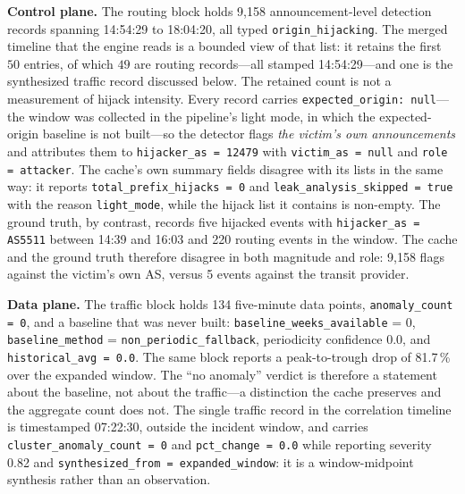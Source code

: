\textbf{Control plane.} The routing block holds 9{,}158
announcement-level detection records spanning 14:54:29 to 18:04:20, all
typed \texttt{origin\_hijacking}. The merged timeline that the engine
reads is a bounded view of that list: it retains the first $50$ entries,
of which $49$ are routing records---all stamped 14:54:29---and one is
the synthesized traffic record discussed below. The retained count is not
a measurement of hijack intensity. Every record carries
\texttt{expected\_origin: null}---the window was collected in the
pipeline's light mode, in which the expected-origin baseline is not
built---so the detector flags \emph{the victim's own announcements} and
attributes them to \texttt{hijacker\_as = 12479} with
\texttt{victim\_as = null} and \texttt{role = attacker}. The cache's own
summary fields disagree with its lists in the same way: it reports
\texttt{total\_prefix\_hijacks = 0} and
\texttt{leak\_analysis\_skipped = true} with the reason
\texttt{light\_mode}, while the hijack list it contains is non-empty. The
ground truth, by contrast, records five hijacked events with
\texttt{hijacker\_as = AS5511} between 14:39 and 16:03 and 220 routing
events in the window. The cache and the ground truth therefore disagree
in both magnitude and role: 9{,}158 flags against the victim's own AS,
versus 5 events against the transit provider.

\textbf{Data plane.} The traffic block holds 134 five-minute data
points, \texttt{anomaly\_count = 0}, and a baseline that was never
built: \texttt{baseline\_weeks\_available} = 0,
\texttt{baseline\_method} = \texttt{non\_periodic\_fallback}, periodicity
confidence 0.0, and \texttt{historical\_avg = 0.0}. The same block
reports a peak-to-trough drop of 81.7\,\% over the expanded window. The
``no anomaly'' verdict is therefore a statement about the baseline, not
about the traffic---a distinction the cache preserves and the aggregate
count does not. The single traffic record in the correlation timeline is
timestamped 07:22:30, outside the incident window, and carries
\texttt{cluster\_anomaly\_count = 0} and \texttt{pct\_change = 0.0}
while reporting severity 0.82 and
\texttt{synthesized\_from = expanded\_window}: it is a window-midpoint
synthesis rather than an observation.

